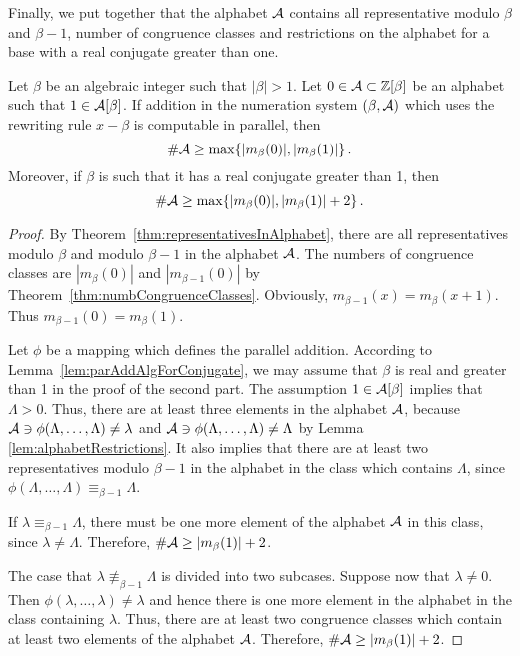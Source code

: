 Finally, we put together that the alphabet $\mathcal{A}$ contains all representative modulo $\beta$ and $\beta-1$, number of congruence classes and restrictions on the alphabet for a base with a real conjugate greater than one.
\begin{thm}
\label{thm:lowerBoundAlphabet}

Let $\beta$ be an algebraic integer such that $|\beta|>1$. Let $0\in \mathcal{A}\subset \mathbb{Z}[\beta]$ be an alphabet such that $1\in \mathcal{A}[\beta]$. If addition in the numeration system $(\beta, \mathcal{A})$ which uses the rewriting rule $x-\beta$ is computable in parallel, then
$$
\#\mathcal{A} \geq \max \{|m_\beta(0)|, |m_\beta(1)|\}\,.
$$
Moreover, if $\beta$ is such that it has a real conjugate greater than 1, then 
$$
\#\mathcal{A} \geq \max \{|m_\beta(0)|, |m_\beta(1)|+2\}\,.
$$
\end{thm}
\begin{proof}
By Theorem~\ref{thm:representativesInAlphabet}, there are all representatives modulo $\beta$ and modulo $\beta-1$ in the alphabet $\mathcal{A}$. The numbers of congruence classes are $|m_\beta(0)|$ and $|m_{\beta-1}(0)|$ by Theorem~\ref{thm:numbCongruenceClasses}. Obviously, $m_{\beta-1}(x) = m_\beta (x+1)$. Thus $m_{\beta-1}(0) = m_\beta (1)$.

Let $\phi$ be a mapping which defines the parallel addition. According to Lemma~\ref{lem:parAddAlgForConjugate}, we may assume that $\beta$ is real and greater than 1 in the proof of the second part. The assumption $1\in \mathcal{A}[\beta]$ implies that $\Lambda>0$. Thus, there are at least three elements in the alphabet $\mathcal{A}$, because $\mathcal{A}\ni\phi(\Lambda,\dots,\Lambda)\neq \lambda$ and $\mathcal{A}\ni\phi(\Lambda,\dots,\Lambda)\neq \Lambda$ by Lemma \ref{lem:alphabetRestrictions}. It also implies that there are at least two representatives modulo $\beta-1$ in the alphabet in the class which contains $\Lambda$, since $\phi(\Lambda,\dots,\Lambda)\equiv_{\beta-1} \Lambda$.  

If $\lambda\equiv_{\beta-1}\Lambda$, there must be one more element of the alphabet $\mathcal{A}$ in this class, since $\lambda \neq \Lambda$. Therefore, $\#\mathcal{A}\geq |m_\beta(1)|+2$. 

The case that $\lambda\not\equiv_{\beta-1}\Lambda$ is divided into two subcases. Suppose now that $\lambda\neq 0$. Then $\phi(\lambda,\dots,\lambda)\neq \lambda$ and hence there is one more element in the alphabet in the class containing $\lambda$. Thus, there are at least two congruence classes which contain at least two elements of the alphabet $\mathcal{A}$. Therefore, $\#\mathcal{A}\geq |m_\beta(1)|+2$.


\end{proof}
